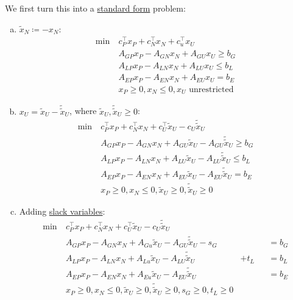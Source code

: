 We first turn this into a \hyperref[def:standard-form]{standard form} problem:
\begin{enumerate}[(a)]
	\item \(\widetilde{x}_N \coloneqq -x_N\):
	      \[
		      \begin{aligned}
			      \min~ & c^{\top}_P x_P + c^{\top}_N x_N + c^{\top}_u x_U \\
			            & A_{GP}x_P -A_{GN}x_N + A_{GU}x_U\geq b_G         \\
			            & A_{LP}x_P -A_{LN}x_N + A_{LU}x_U \leq b_L        \\
			            & A_{EP}x_P -A_{EN}x_N + A_{EU}x_U = b_E           \\
			            & x_P\geq 0, x_N \leq 0, x_U \text{ unrestricted}
		      \end{aligned}
	      \]
	\item \(x_U = \widetilde{x}_U - \widetilde{\widetilde{x}}_U\), where \(\widetilde{x}_U, \widetilde{\widetilde{x}}_U \geq 0\):
	      \[
		      \begin{aligned}
			      \min~ & c^{\top}_P x_P + c^{\top}_N x_N + c^{\top}_U \widetilde{x}_U - c_U \widetilde{\widetilde{x}}_U \\
			            & A_{GP}x_P -A_{GN}x_N + A_{GU}\widetilde{x}_U -A_{GU}\widetilde{\widetilde{x}}_U \geq b_G       \\
			            & A_{LP}x_P -A_{LN}x_N + A_{LU}\widetilde{x}_U -A_{LU}\widetilde{\widetilde{x}}_U\leq b_L        \\
			            & A_{EP}x_P -A_{EN}x_N + A_{EU}\widetilde{x}_U -A_{EU}\widetilde{\widetilde{x}}_U= b_E           \\
			            & x_P\geq 0, x_N \leq 0, \widetilde{x}_U \geq 0, \widetilde{\widetilde{x}}_U\geq 0
		      \end{aligned}
	      \]
	\item Adding \hyperref[def:slack-variable]{slack variables}:
	      \[
		      \begin{alignedat}{3}
			      \min~ & c^{\top}_P x_P + c^{\top}_N x_N + c^{\top}_U \widetilde{x}_U - c_U \widetilde{\widetilde{x}}_U                             \\
			            & A_{GP}x_P -A_{GN}x_N + A_{Gu}\widetilde{x}_U -A_{GU}\widetilde{\widetilde{x}}_U - s_G                   &       &  & = b_G \\
			            & A_{LP}x_P -A_{LN}x_N + A_{Lu}\widetilde{x}_U -A_{LU}\widetilde{\widetilde{x}}_U                         & + t_L &  & = b_L \\
			            & A_{EP}x_P -A_{EN}x_N + A_{Eu}\widetilde{x}_U -A_{EU}\widetilde{\widetilde{x}}_U                         &       &  & = b_E \\
			            & x_P\geq 0, x_N \leq 0, \widetilde{x}_U \geq 0, \widetilde{\widetilde{x}}_U\geq 0, s_G\geq 0, t_L \geq 0
		      \end{alignedat}
	      \]
\end{enumerate}

